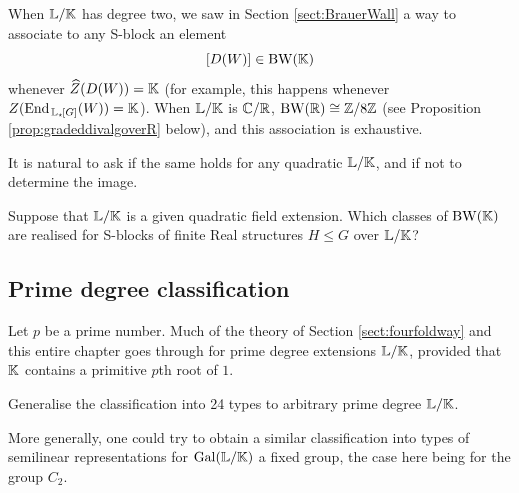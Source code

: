 When ${\mathbb L} / {\mathbb K}$ has degree two, we saw in Section \ref{sect:BrauerWall} a way to associate to any S-block an element
\[
[D(W)] \in \operatorname{BW}({\mathbb K})
\]
whenever $\widehat{Z}(D(W)) = {\mathbb K}$ (for example, this happens whenever $Z(\operatorname{End}_{\, {\mathbb L}_{\star \hspace{-0.1em}}[G]}(W)) = {\mathbb K}$). When ${\mathbb L} / {\mathbb K}$ is ${\mathbb C} / {\mathbb R}$, $\operatorname{BW}({\mathbb R}) \cong {\mathbb Z} / 8 {\mathbb Z}$ (see Proposition \ref{prop:gradeddivalgoverR} below), and this association is exhaustive.

It is natural to ask if the same holds for any quadratic ${\mathbb L} / {\mathbb K}$, and if not to determine the image.

\begin{prob}
Suppose that ${\mathbb L} / {\mathbb K}$ is a given quadratic field extension. Which classes of $\operatorname{BW}({\mathbb K})$ are realised for S-blocks of finite Real structures $H \leq G$ over ${\mathbb L} / {\mathbb K}$?
\end{prob}

\subsection{Prime degree classification}

Let $p$ be a prime number. Much of the theory of Section \ref{sect:fourfoldway} and this entire chapter goes through for prime degree extensions ${\mathbb L} / {\mathbb K}$, provided that ${\mathbb K}$ contains a primitive $p$th root of $1$. 

\begin{prob}
Generalise the classification into 24 types to arbitrary prime degree ${\mathbb L} / {\mathbb K}$.
\end{prob}

More generally, one could try to obtain a similar classification into types of semilinear representations for $\operatorname{Gal}({\mathbb L}/ {\mathbb K})$ a fixed group, the case here being for the group $C_2$.

